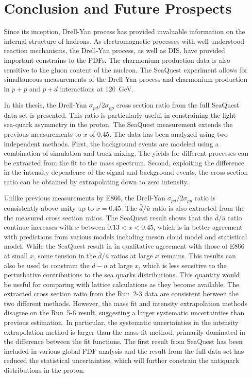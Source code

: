 \documentclass[../main.tex]{subfiles}
\begin{document}
\ifSubfilesClassLoaded{
	\mainmatter
	\setcounter{chapter}{5}
}{}

\chapter{Conclusion and Future Prospects}
\label{ch:conclusion}
Since its inception, Drell-Yan process has provided invaluable information
on the internal structure of hadrons.
As electromagnetic processes with well understood reaction mechanisms,
the Drell-Yan process, as well as DIS, have provided important constrains to the PDFs. 
The charmonium production data is also sensitive to the gluon content of the nucleon.
The SeaQuest experiment allows for simultaneous measurements of the Drell-Yan process
and charmonium production in $p+p$ and $p+d$ interactions at \SI{120}{\GeV}.

In this thesis, the Drell-Yan $\sigma_{pd}/2\sigma_{pp}$ cross section ratio from the full
SeaQuest data set is presented. This ratio is particularly useful in constraining
the light sea-quark asymmetry in the proton. The SeaQuest measurement extends the
previous measurements to $x$ of $0.45$.
The data has been analyzed using two independent methods.
First, the background events are modeled using a combination of simulation and
track mixing. The yields for different processes can be extracted from the fit to
the mass spectrum.
Second, exploiting the difference in the intensity dependence of the signal and background events,
the cross section ratio can be obtained by extrapolating down to zero intensity.

Unlike previous measurements by E866, the  Drell-Yan $\sigma_{pd}/2\sigma_{pp}$ ratio
is consistently above unity up to $x=0.45$.
The $\bar{d}/\bar{u}$ ratio is also extracted from the the measured cross section ratios.
The SeaQuest result shows that the $\bar{d}/\bar{u}$ ratio continue increases with $x$ between $0.13<x<0.45$,
which is in better agreement with predictions from various models including meson cloud model and statistical model.
While the SeaQuest result in in qualitative agreement with those of E866 at small $x$,
some tension in the $\bar{d}/\bar{u}$ ratios at large $x$ remains.
This results can also be used to constrain the $\bar{d}-\bar{u}$ at large $x$,
which is less sensitive to the perturbative contributions to the sea quarks distributions.
This quantity would be useful for comparing with lattice calculations as they become available.
The extracted cross section ratio from the Run~2-3
data are consistent between the two different methods. However, the mass fit
and intensity extrapolation methods disagree on the Run~5-6 result,
suggesting a larger systematic uncertainties than previous estimation.
In particular, the systematic uncertainties in the intensity extrapolation
method is larger than the mass fit method, primarily dominated in the difference
between the fit functions.
The first result from SeaQuest has been included in various global PDF analysis
and the result from the full data set has reduced the statistical uncertainties,
which will further constrain the antiquark distributions in the proton.
\end{document}
